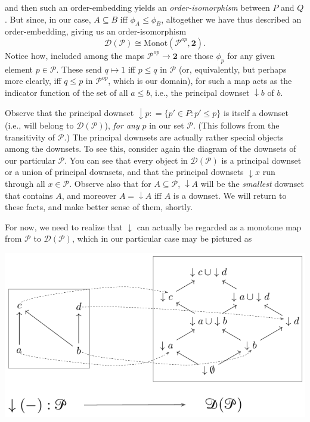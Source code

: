 \documentclass[a4paper]{book}
\theoremstyle{definition}
\theoremstyle{definition}
\theoremstyle{definition}
\theoremstyle{theorem}
\theoremstyle{definition}
\begin{document}
and then such an order-embedding yields an \textit{order-isomorphism}  between $P$ and $Q$.
But since, in our case, $A \subseteq  B$ iff $\phi_A \leq \phi_B$, altogether we have thus described an order-embedding, giving us an order-isomorphism   
\begin{equation*}
\mathcal{D}(\mathcal{P}) \cong \text{Monot}(\mathcal{P}^{op}, \textbf{2}). 
\end{equation*}   
Notice how, included among the maps $\mathcal{P}^{op} \rightarrow \textbf{2}$ are those $\phi_p$ for any given element $p \in \mathcal{P}$. These send $q \mapsto 1$ iff $p \leq q$ in $\mathcal{P}$ (or, equivalently, but perhaps more clearly, iff $q \leq p$ in $\mathcal{P}^{op}$, which is our domain), for such a map acts as the indicator function of the set of all $a \leq b$, i.e., the principal downset $\downarrow b$ of $b$. \par 
Observe that the principal downset $\downarrow p : = \{p' \in P : p' \leq p \}$ is itself a downset (i.e., will belong to $\mathcal{D}(\mathcal{P})$), \textit{for any} $p$ in our set $\mathcal{P}$. (This follows from the transitivity of $\mathcal{P}$.) The principal downsets are actually rather special objects among the downsets. To see this, consider again the diagram of the downsets of our particular $\mathcal{P}$. You can see that every object in $\mathcal{D}(\mathcal{P})$ is a principal downset or a union of principal downsets, and that the principal downsets $\downarrow x$ run through all $x \in \mathcal{P}$. Observe also that for $A \subseteq  \mathcal{P}$, $\downarrow A$ will be the \textit{smallest} downset that contains $A$, and moreover $A = \downarrow A$ iff $A$ is a downset. We will return to these facts, and make better sense of them, shortly. \par 
For now, we need to realize that $\downarrow$ can actually be regarded as a monotone map from $\mathcal{P}$ to $\mathcal{D}(\mathcal{P})$, which in our particular case may be pictured as 
\begin{center}
	\includegraphics*[scale=0.25]{DownSetFunctor.png}
\end{center}
\end{document}
